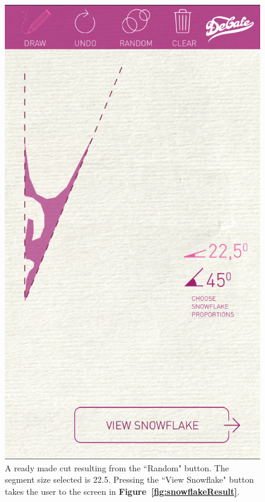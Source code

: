\documentclass[11pt]{article}
\begin{document}
                    \begin{figure}[!ht]
                        \begin{minipage}{0.45\textwidth}
                            \centering \includegraphics[width=0.7\linewidth]{Images/snowflakeSegmentCut}
                            \caption{A ready made cut resulting from the ``Random" button. The segment size selected is 22.5\textdegree{}. Pressing the ``View Snowflake" button takes the user to the screen in \textbf{Figure~\ref{fig:snowflakeResult}}.\\}
                            \label{fig:snowflakeSegmentCut}
                        \end{minipage}\hfill
                        \begin{minipage}{0.45\textwidth}
                            \centering

\end{minipage}
\end{figure}
\end{document}
